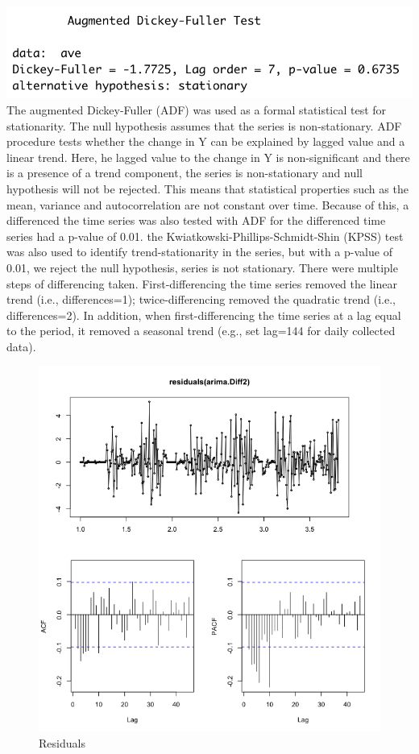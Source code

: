 \documentclass[]{article}
\begin{document}
\includegraphics{ADFinal.png} The augmented Dickey-Fuller (ADF) was used
as a formal statistical test for stationarity. The null hypothesis
assumes that the series is non-stationary. ADF procedure tests whether
the change in Y can be explained by lagged value and a linear trend.
Here, he lagged value to the change in Y is non-significant and there is
a presence of a trend component, the series is non-stationary and null
hypothesis will not be rejected. This means that statistical properties
such as the mean, variance and autocorrelation are not constant over
time. Because of this, a differenced the time series was also tested
with ADF for the differenced time series had a p-value of 0.01. the
Kwiatkowski-Phillips-Schmidt-Shin (KPSS) test was also used to identify
trend-stationarity in the series, but with a p-value of 0.01, we reject
the null hypothesis, series is not stationary. There were multiple steps
of differencing taken. First-differencing the time series removed the
linear trend (i.e., differences=1); twice-differencing removed the
quadratic trend (i.e., differences=2). In addition, when
first-differencing the time series at a lag equal to the period, it
removed a seasonal trend (e.g., set lag=144 for daily collected data).

\begin{figure}
\centering
\includegraphics{ResidualsFP.png}
\caption{Residuals}
\end{figure}
\end{document}
